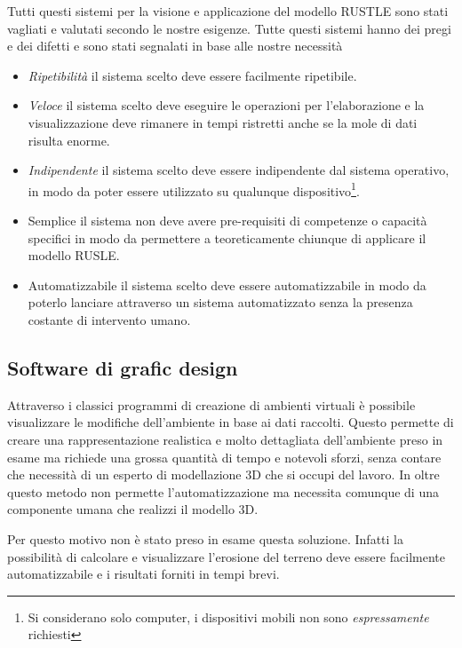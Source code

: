 Tutti questi sistemi per la visione e applicazione del modello RUSTLE sono stati vagliati e valutati secondo le nostre esigenze. Tutte questi sistemi hanno dei pregi e dei difetti e sono stati segnalati in base alle nostre necessità

\begin{itemize}
	
	\item \textit{Ripetibilità} il sistema scelto deve essere facilmente ripetibile.
	
	\item \textit{Veloce} il sistema scelto deve eseguire le operazioni per l'elaborazione e la visualizzazione deve rimanere in tempi ristretti anche se la mole di dati risulta enorme.
	
	\item \textit{Indipendente} il sistema scelto deve essere indipendente dal sistema operativo, in modo da poter essere utilizzato su qualunque dispositivo\footnote{Si considerano solo computer, i dispositivi mobili non sono \textit{espressamente} richiesti}.
	
	\item{Semplice} il sistema non deve avere pre-requisiti di competenze o capacità specifici in modo da permettere a teoreticamente chiunque di applicare il modello RUSLE.
	
	\item{Automatizzabile} il sistema scelto deve essere automatizzabile in modo da poterlo lanciare attraverso un sistema automatizzato senza la presenza costante di intervento umano.
	
\end{itemize}

\subsection{Software di grafic design}
Attraverso i classici programmi di creazione di ambienti virtuali è possibile visualizzare le modifiche dell'ambiente in base ai dati raccolti. Questo permette di creare una rappresentazione realistica e molto dettagliata dell'ambiente preso in esame ma richiede una grossa quantità di tempo e notevoli sforzi, senza contare che necessità di un esperto di modellazione 3D che si occupi del lavoro. In oltre questo metodo non permette l'automatizzazione ma necessita comunque di una componente umana che realizzi il modello 3D. 

Per questo motivo non è stato preso in esame questa soluzione. Infatti la possibilità di calcolare e visualizzare l'erosione del terreno deve essere facilmente automatizzabile e i risultati forniti in tempi brevi.

